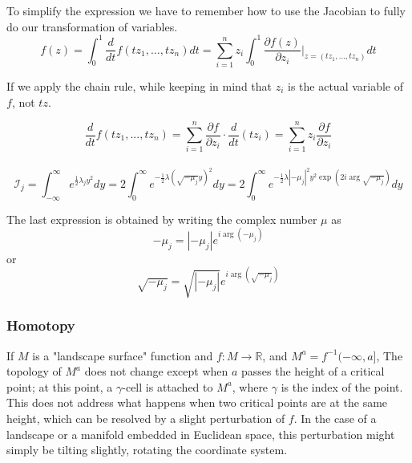 To simplify the expression we have to remember how to use the Jacobian to fully do our transformation of variables.
\\

$$
f(z) = \int_{0}^{1} \frac{d}{dt} f(tz_1 , \dots , tz_n) dt
= 
\sum_{i=1}^{n} z_i \int_{0}^{1} \frac{\partial f(z)}{\partial z_i} \Big|_{z = (tz_1, \dots , tz_n)} dt
$$

If we apply the chain rule, while keeping in mind that $z_i$ is the actual variable of $f$,
not $tz$.

$$
\frac{d}{dt} f(tz_1, ..., tz_n)
=
\sum_{i=1}^{n} \frac{\partial f}{\partial z_i} \cdot \frac{d}{dt}(tz_i)
=
\sum_{i=1}^{n} z_i \frac{\partial f}{\partial z_i}
$$
\\


$$
\mathcal{I}_j
=
\int_{-\infty}^{\infty} e^{\frac{1}{2}\lambda_j y^2} dy
=
2 \int_{0}^{\infty} e^{-\frac{1}{2}\lambda\left(\sqrt{-\mu_j} y\right)^2} dy
=
2 \int_{0}^{\infty} e^{-\frac{1}{2}\lambda |-\mu_j|^2 y^2 \exp(2i \arg \sqrt{-\mu_j})} dy
$$

The last expression is obtained by writing the complex number $\mu$ as
$$
-\mu_j = |-\mu_j| e^{i \arg(-\mu_j)}
$$
or
$$
\sqrt{-\mu_j} = \sqrt{|-\mu_j|} e^{i \arg(\sqrt{-\mu_j})}
$$

\subsubsection{Homotopy}

If $M$ is a "landscape surface" function and $f : M \rightarrow \mathbb{R}$,
and $M^a = f^{-1} (-\infty, a]$,
The topology of $M^{a}$ does not change except when $a$ passes the height of a critical point;
at this point, a $\gamma$-cell is attached to $M^{a}$, where $\gamma$ is the index of the point.
This does not address what happens when two critical points are at the same height,
which can be resolved by a slight perturbation of $f$.
In the case of a landscape or a manifold embedded in Euclidean space, this perturbation might simply be tilting slightly, rotating the coordinate system. 